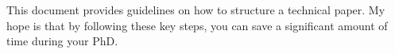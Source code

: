 This document provides guidelines on how to structure a technical paper. 
My hope is that by following these key steps, you can save a significant amount of time
during your PhD. 
